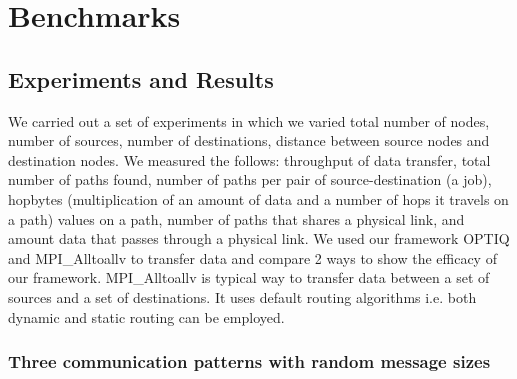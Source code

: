 \section{Benchmarks}
\label{sec:benchmark}





%



\subsection{Experiments and Results}

We carried out a set of experiments in which we varied total number of nodes, number of sources, number of destinations, distance between source nodes and destination nodes. We measured the follows: throughput of data transfer, total number of paths found, number of paths per pair of source-destination (a job), hopbytes (multiplication of an amount of data and a number of hops it travels on a path) values on a path, number of paths that shares a physical link, and amount data that passes through a physical link. We used our framework OPTIQ and MPI\_Alltoallv to transfer data and compare 2 ways to show the efficacy of our framework. MPI\_Alltoallv is typical way to transfer data between a set of sources and a set of destinations. It uses default routing algorithms i.e. both dynamic and static routing can be employed.



\subsubsection {Three communication patterns with random message sizes}


%

